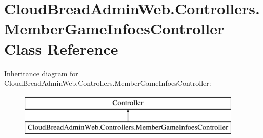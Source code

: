 \hypertarget{class_cloud_bread_admin_web_1_1_controllers_1_1_member_game_infoes_controller}{}\section{Cloud\+Bread\+Admin\+Web.\+Controllers.\+Member\+Game\+Infoes\+Controller Class Reference}
\label{class_cloud_bread_admin_web_1_1_controllers_1_1_member_game_infoes_controller}
Inheritance diagram for Cloud\+Bread\+Admin\+Web.\+Controllers.\+Member\+Game\+Infoes\+Controller\+:\begin{figure}[H]
\begin{center}
\leavevmode
\includegraphics[height=2.000000cm]{class_cloud_bread_admin_web_1_1_controllers_1_1_member_game_infoes_controller}
\end{center}
\end{figure}
